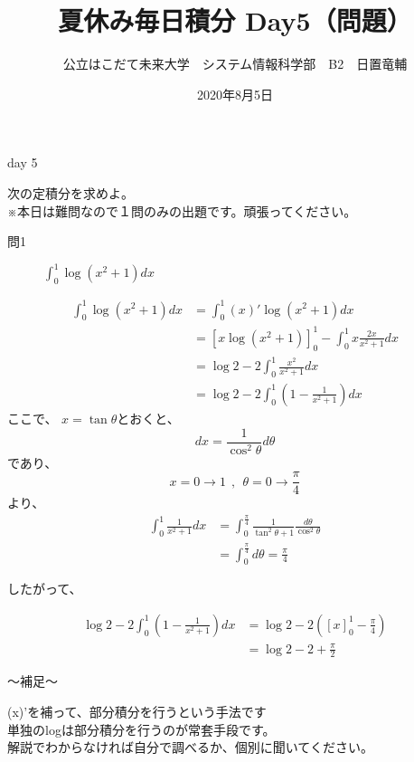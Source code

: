 \documentclass[dvipdfmx,uplatex]{jsarticle}
\title{夏休み毎日積分 Day5（問題）}
\author{公立はこだて未来大学　システム情報科学部　B2　日置竜輔}
\date{2020年8月5日}
\begin{document}
\maketitle

\begin{itembox}[c]{day 5}
    \begin{center}
        次の定積分を求めよ。\\
        ※本日は難問なので１問のみの出題です。頑張ってください。
    \end{center}
\end{itembox}

\begin{description}
    \item [問1] $ \displaystyle \int_0^1 \log(x^2 + 1) dx $
\end{description}

\begin{align*}
    \int_0^1 \log(x^2 + 1) dx &= \int_0^1 (x)'\log(x^2 + 1) dx \\
        &= [x\log(x^2 + 1)]_0^1 - \int_0^1 x\frac{2x}{x^2 + 1} dx \\
        &= \log2 - 2\int_0^1\frac{x^2}{x^2 + 1} dx \\
        &= \log2 - 2\int_0^1 (1 - \frac{1}{x^2+1} ) dx
\end{align*}
ここで、 $ \displaystyle x = \tan{\theta} $とおくと、
\begin{equation*}
  dx = \frac{1}{\cos^2\theta}d{\theta}
\end{equation*}
であり、
\begin{equation*}
  x = 0 → 1 ~~,~~\theta = 0 → \frac{\pi}{4}
\end{equation*}
より、
\begin{align*}
    \int_0^1 \frac{1}{x^2 + 1} dx &= \int_0^\frac{\pi}{4} \frac{1}{\tan^2\theta + 1}\frac{d\theta}{\cos^2\theta} \\
    &= \int_0^\frac{\pi}{4} d\theta = \frac{\pi}{4}
\end{align*}

したがって、

\begin{align*}
    \log2 - 2\int_0^1 (1 - \frac{1}{x^2 + 1}) dx &= \log2 - 2([x]_0^1 - \frac{\pi}{4}) \\
    &= \log2 - 2 + \frac{\pi}{2}
\end{align*}

\begin{boxnote}
    〜補足〜
    \begin{center}
        (x)'を補って、部分積分を行うという手法です\\
        単独のlogは部分積分を行うのが常套手段です。 \\
        解説でわからなければ自分で調べるか、個別に聞いてください。
    \end{center}
\end{boxnote}
\end{document}
